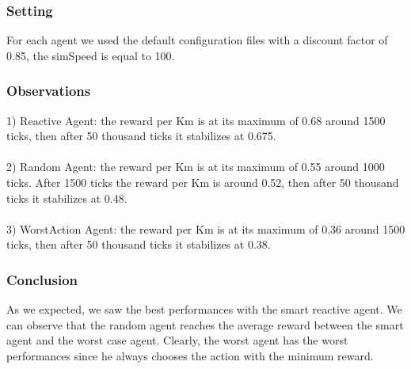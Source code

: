 \documentclass[11pt]{article}
\begin{document}
\subsubsection{Setting}
For each agent we used the default configuration files with a discount factor of 0.85, the simSpeed is equal to 100.

\subsubsection{Observations}

1) Reactive Agent: the reward per Km is at its maximum of 0.68 around 1500 ticks, then after 50 thousand ticks it stabilizes at 0.675.
\\
\\
2) Random Agent: the reward per Km is at its maximum of 0.55 around 1000 ticks. After 1500 ticks the reward per Km is around 0.52, then after 50 thousand ticks it stabilizes at 0.48.
\\
\\
3) WorstAction Agent: the reward per Km is at its maximum of 0.36 around 1500 ticks, then after 50 thousand ticks it stabilizes at 0.38.

\subsubsection{Conclusion}
As we expected, we saw the best performances with the smart reactive agent. We can observe that the random agent reaches the average reward between the smart agent and the worst case agent. Clearly, the worst agent has the worst performances since he always chooses the action with the minimum reward. 
\end{document}
